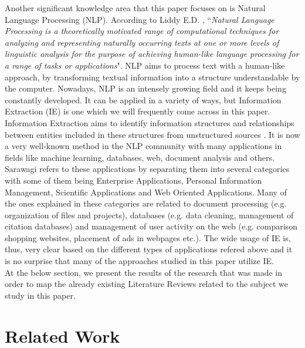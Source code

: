 Another significant knowledge area that this paper focuses on is Natural Language Processing (NLP). According to Liddy E.D. \cite{liddy2001natural}, ``\emph{Natural Language Processing is a theoretically motivated 
range of computational techniques for analyzing and representing naturally occurring texts at one or more levels of linguistic analysis for the purpose of achieving human-like language processing for a 
range of tasks or applications}". NLP aims to process text with a human-like approach, by transforming textual information into a structure understandable by the computer. Nowadays, NLP is an intensely growing 
field and it keeps being constantly developed. It can be applied in a variety of ways, but Information Extraction (IE) is one which we will frequently come across in this paper. \\

Information Extraction aims to identify information structures and relationships between entities included in these structures from unstructured sources \cite{infoextraction}. It is now a very well-known 
method in the NLP community with many applications in fields like machine learning, databases, web, document analysis and others. Sarawagi \cite{infoextraction} refers to these applications by separating them 
into several categories with some of them being Enterprise Applications, Personal Information Management, Scientific Applications and Web Oriented Applications. Many of the ones explained in these categories 
are related to document processing (e.g. organization of files and projects), databases (e.g. data cleaning, management of citation databases) and management of user activity on the web (e.g. comparison shopping 
websites, placement of ads in webpages etc.). The wide usage of IE is, thus, very clear based on the different types of applications refered above and it is no surprise that many of the approaches studied in 
this paper utilize IE. \\

At the below section, we present the results of the research that was made in order to map the already existing Literature Reviews related to the subject we study in this paper.

\section{Related Work}

